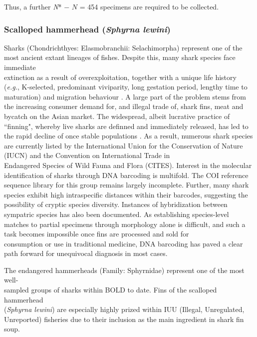 \noindent Thus, a further \textit{N}* $-$ $N$ = 454 specimens are required to be collected.


\subsubsection{Scalloped hammerhead (\textit{Sphyrna lewini})}

Sharks (Chondrichthyes: Elasmobranchii: Selachimorpha) represent one of the most ancient extant lineages of fishes. Despite this, many shark species face immediate \\ extinction as a result of overexploitation, together with a unique life history \\ (\textit{e.g.}, K-selected, predominant viviparity, long gestation period, lengthy time to maturation) and migration behaviour \cite{naaum2016seafood}. A large part of the problem stems from the increasing consumer demand for, and illegal trade of, shark fins, meat and bycatch on the Asian market. The widespread, albeit lucrative practice of ``finning", whereby live sharks are definned and immediately released, has led to the rapid decline of once stable populations \cite{steinke2017dna}. As a result, numerous shark species are currently listed by the International Union for the Conservation of Nature (IUCN) and the Convention on International Trade in \\ Endangered Species of Wild Fauna and Flora (CITES). Interest in the molecular \\ identification of sharks through DNA barcoding is multifold. The COI reference sequence library for this group remains largely incomplete.  Further, many shark species exhibit high intraspecific distances within their barcodes, suggesting the possibility of cryptic species diversity. Instances of hybridization between sympatric species has also been documented.  As establishing species-level matches to partial specimens through morphology alone is difficult, and such a task becomes impossible once fins are processed and sold for \\ consumption or use in traditional medicine, DNA barcoding has paved a clear path forward for unequivocal diagnosis in most cases.   

The endangered hammerheads (Family: Sphyrnidae) represent one of the most well-\\sampled groups of sharks within BOLD to date. Fins of the scalloped hammerhead \\ (\textit{Sphyrna lewini}) are especially highly prized within IUU (Illegal, Unregulated, \\ Unreported) fisheries due to their inclusion as the main ingredient in shark fin soup. 

